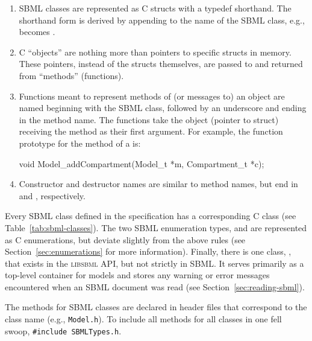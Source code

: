 \documentclass{sbmlmanual}
\begin{document}
\begin{enumerate}

  \item SBML classes are represented as C structs with a typedef
  shorthand.  The shorthand form is derived by appending 
  to the name of the SBML class, e.g.,  becomes
  .

  \item C ``objects'' are nothing more than pointers to specific
  structs in memory.  These pointers, instead of the structs
  themselves, are passed to and returned from ``methods'' (functions).

  \item Functions meant to represent methods of (or messages to) an
  object are named beginning with the SBML class, followed by an
  underscore and ending in the method name.  The functions take the
  object (pointer to struct) receiving the method as their first
  argument.  For example, the function prototype for the
   method of a  is:

    \begin{example}[c]
    void Model_addCompartment(Model_t *m, Compartment_t *c);
    \end{example}

  \item Constructor and destructor names are similar to method names,
  but end in  and , respectively.

\end{enumerate}


Every SBML class defined in the specification has a corresponding C
class (see Table~\ref{tab:sbml-classes}).  The two SBML enumeration
types,  and  are represented as C
enumerations, but deviate slightly from the above rules (see
Section~\ref{sec:enumerations} for more information).  Finally, there
is one class, , that exists in the
\textsc{libsbml} API, but not strictly in SBML.  It serves primarily
as a top-level container for models and stores any warning or error
messages encountered when an SBML document was read (see
Section~\ref{sec:reading-sbml}).

The methods for SBML classes are declared in header files that
correspond to the class name (e.g., \texttt{Model.h}).  To include all
methods for all classes in one fell swoop, \texttt{\#include
SBMLTypes.h}.
\end{document}
